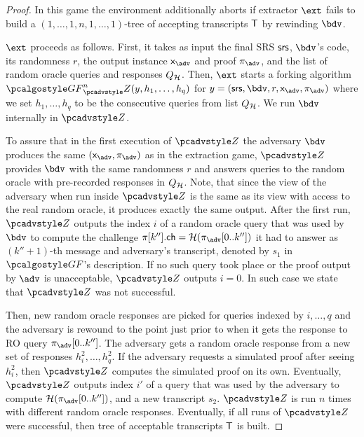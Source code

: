 \begin{proof}
In this game the environment additionally aborts if extractor $\ext$ fails to build a
$(1, \ldots, 1, n, 1, \ldots, 1)$-tree of accepting transcripts $\mathsf{T}$ by rewinding
$\bdv$.

$\ext$ proceeds as follows. First, it takes as input the final SRS $\mathsf{srs}$,
$\bdv$'s code, its randomness $r$, the output instance $\inp_{\advse}$ and proof
$\zkproof_{\advse}$, and the list of random oracle queries and responses
$Q_{\mathcal{H}}$. Then, $\ext$ starts a forking algorithm
$\genforking^{n}_\zdv(y,h_1, \ldots, h_q)$ for
$y = (\srs, \bdv, r, \inp_{\advse}, \zkproof_{\advse})$ where we set
$h_1, \ldots, h_q$ to be the consecutive queries from list $Q_{\mathcal{H}}$. We run $\bdv$
internally in $\zdv$. 
		
To assure that in the first execution of $\zdv$ the adversary $\bdv$ produces the
same $(\inp_{\advse}, \zkproof_{\advse})$ as in the extraction game, $\zdv$ provides
$\bdv$ with the same randomness $r$ and answers queries to the random oracle with
pre-recorded responses in $Q_{\mathcal{H}}$.
Note, that since the view of the adversary when run inside $\zdv$ is the same as its
view with access to the real random oracle, it produces exactly the same
output. After the first run, $\zdv$ outputs the index $i$ of a random oracle query
that was used by $\bdv$ to compute the challenge
$\zkproof[k''].\ch = \ro(\zkproof_{\advse}[0..k''])$ it had to answer as
$(k'' + 1)$-th message and adversary's transcript, denoted by $s_1$ in
$\genforking$'s description. If no such query took place or the proof output by
$\advse$ is unacceptable, $\zdv$ outputs $i = 0$. In such case we state that $\zdv$
was not successful.
		
Then, new random oracle responses are picked for queries indexed by $i, \ldots, q$
and the adversary is rewound to the point just prior to when it gets the response to
RO query $\zkproof_{\advse}[0..k'']$. The adversary gets a random oracle response from
a new set of responses $h^2_i, \ldots, h^2_q$. If the adversary requests a simulated
proof after seeing $h^2_i$, then $\zdv$ computes the simulated proof on its
own. Eventually, $\zdv$ outputs index $i'$ of a query that was used by the adversary
to compute $\ro(\zkproof_{\advse}[0..k''])$, and a new transcript $s_2$. $\zdv$ is run
$n$ times with different random oracle responses.  Eventually, if all runs of $\zdv$
were successful, then tree of acceptable transcripts $\mathsf{T}$ is built.
		

\end{proof}
